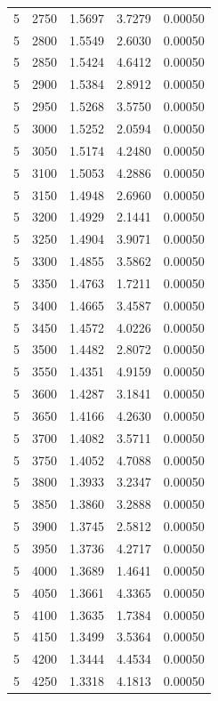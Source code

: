 \begin{longtable}{ccccc}
    5 & 2750 & 1.5697 & 3.7279 & 0.00050 \\
    5 & 2800 & 1.5549 & 2.6030 & 0.00050 \\
    5 & 2850 & 1.5424 & 4.6412 & 0.00050 \\
    5 & 2900 & 1.5384 & 2.8912 & 0.00050 \\
    5 & 2950 & 1.5268 & 3.5750 & 0.00050 \\
    5 & 3000 & 1.5252 & 2.0594 & 0.00050 \\
    5 & 3050 & 1.5174 & 4.2480 & 0.00050 \\
    5 & 3100 & 1.5053 & 4.2886 & 0.00050 \\
    5 & 3150 & 1.4948 & 2.6960 & 0.00050 \\
    5 & 3200 & 1.4929 & 2.1441 & 0.00050 \\
    5 & 3250 & 1.4904 & 3.9071 & 0.00050 \\
    5 & 3300 & 1.4855 & 3.5862 & 0.00050 \\
    5 & 3350 & 1.4763 & 1.7211 & 0.00050 \\
    5 & 3400 & 1.4665 & 3.4587 & 0.00050 \\
    5 & 3450 & 1.4572 & 4.0226 & 0.00050 \\
    5 & 3500 & 1.4482 & 2.8072 & 0.00050 \\
    5 & 3550 & 1.4351 & 4.9159 & 0.00050 \\
    5 & 3600 & 1.4287 & 3.1841 & 0.00050 \\
    5 & 3650 & 1.4166 & 4.2630 & 0.00050 \\
    5 & 3700 & 1.4082 & 3.5711 & 0.00050 \\
    5 & 3750 & 1.4052 & 4.7088 & 0.00050 \\
    5 & 3800 & 1.3933 & 3.2347 & 0.00050 \\
    5 & 3850 & 1.3860 & 3.2888 & 0.00050 \\
    5 & 3900 & 1.3745 & 2.5812 & 0.00050 \\
    5 & 3950 & 1.3736 & 4.2717 & 0.00050 \\
    5 & 4000 & 1.3689 & 1.4641 & 0.00050 \\
    5 & 4050 & 1.3661 & 4.3365 & 0.00050 \\
    5 & 4100 & 1.3635 & 1.7384 & 0.00050 \\
    5 & 4150 & 1.3499 & 3.5364 & 0.00050 \\
    5 & 4200 & 1.3444 & 4.4534 & 0.00050 \\
    5 & 4250 & 1.3318 & 4.1813 & 0.00050 \\

\end{longtable}
